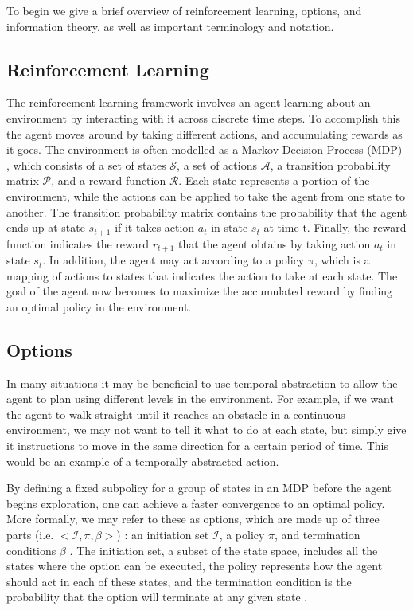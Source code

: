 \documentclass{acm_proc_article-sp}
\begin{document}
To begin we give a brief overview of reinforcement learning, options, and information theory, as well as important terminology and notation.

\subsection{Reinforcement Learning}

The reinforcement learning framework involves an agent learning about an environment by interacting with it across discrete time steps. To accomplish this the agent moves around by taking different actions, and accumulating rewards as it goes.
	 The environment is often modelled as a Markov Decision Process (MDP) \cite{Puterman}, which consists of a set of states $\mathcal{S}$, a set of actions $\mathcal{A}$, a transition probability matrix $\mathcal{P}$, and a reward function $\mathcal{R}$. Each state represents a portion of the environment, while the actions can be applied to take the agent from one state to another. 
	 The transition probability matrix contains the probability that the agent ends up at state $s_{t+1}$ if it takes action $a_t$ in state $s_t$ at time t. Finally, the reward function indicates the reward $r_{t+1}$ that the agent obtains by taking action $a_t$ in state $s_t$. In addition, the agent may act according to a policy $\pi$, which is a mapping of actions to states that indicates the action to take at each state. The goal of the agent now becomes to maximize the accumulated reward by finding an optimal policy in the environment.  
	 
\subsection{Options}

In many situations it may be beneficial to use temporal abstraction to allow the agent to plan using different levels in the environment. For example, if we want the agent to walk straight until it reaches an obstacle in a continuous environment, we may not want to tell it what to do at each state, but simply give it instructions to move in the same direction for a certain period of time. This would be an example of a temporally abstracted action.

By defining a fixed subpolicy for a group of states in an MDP before the agent begins exploration, one can achieve a faster convergence to an optimal policy. More formally, we may refer to these as options, which are made up of three parts (i.e. $<\mathcal{I}, \pi, \beta>$) : an initiation set $\mathcal{I}$, a policy $\pi$, and termination conditions $\beta$ \cite{sutton1999between}. The initiation set, a subset of the state space, includes all the states where the option can be executed, the policy represents how the agent should act in each of these states, and the termination condition is the probability that the option will terminate at any given state \cite{sutton1999between}.
\end{document}
